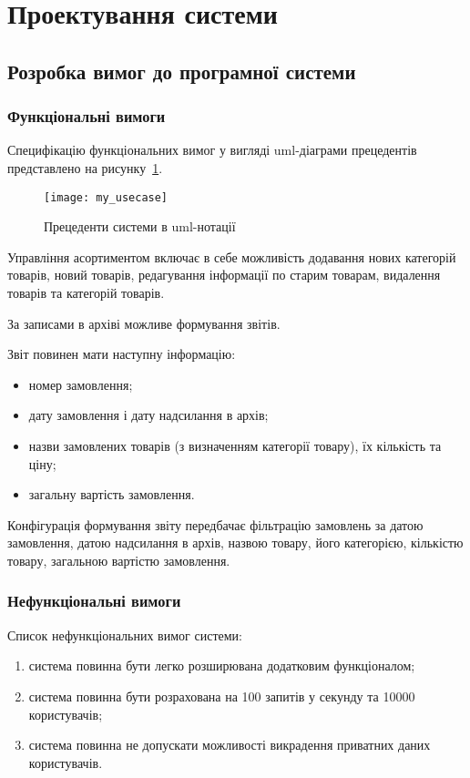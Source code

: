 \section{Проектування системи}
\subsection{Розробка вимог до програмної системи}
\subsubsection{Функціональні вимоги} \label{section:requirements_functional}
Специфікацію функціональних вимог у вигляді \acrshort{uml}-діаграми прецедентів представлено на рисунку~\ref{fig:my_usecase}.
\begin{figure}[H]
    \centering
    \texttt{[image: my\_usecase]}
    \caption{Прецеденти системи в \acrshort{uml}-нотації}
    \label{fig:my_usecase}
\end{figure}

Управління асортиментом включає в себе можливість додавання нових категорій товарів, новий товарів, редагування інформації по старим товарам, видалення товарів та категорій товарів.

За записами в архіві можливе формування звітів. 

Звіт повинен мати наступну інформацію:
\begin{itemize}
    \item номер замовлення;
    \item дату замовлення і дату надсилання в архів;
    \item назви замовлених товарів (з визначенням категорії товару), їх кількість та ціну;
    \item загальну вартість замовлення.
\end{itemize}

Конфігурація формування звіту передбачає фільтрацію замовлень за датою замовлення, датою надсилання в архів, назвою товару, його категорією, кількістю товару, загальною вартістю замовлення. 

\subsubsection{Нефункціональні вимоги}
Список нефункціональних вимог системи:
\begin{enumerate}[label=\arabic*)]
    \item система повинна бути легко розширювана додатковим функціоналом;
    \item система повинна бути розрахована на 100 запитів у секунду та 10000 користувачів;
    \item система повинна не допускати можливості викрадення приватних даних користувачів.
\end{enumerate}

